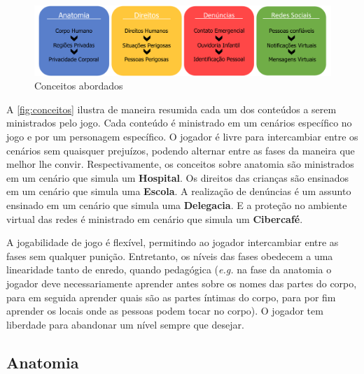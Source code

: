 \begin{figure}[hbt!]
  \caption{\label{fig:conceitos}Conceitos abordados}\vspace{-0.3cm}
  \begin{center}
    \includegraphics[width=\linewidth]{./Visuais/EsquemaFases2.pdf}
    \end{center}\vspace{-0.3cm}
\end{figure}

\vspace{-0.4cm}

A \autoref{fig:conceitos} ilustra de maneira resumida cada um dos conteúdos a serem ministrados pelo jogo. Cada conteúdo é ministrado em um cenários específico no jogo e por um personagem específico. O jogador é livre para intercambiar entre os cenários sem quaisquer prejuízos, podendo alternar entre as fases da maneira que melhor lhe convir. Respectivamente, os conceitos sobre anatomia são ministrados em um cenário que simula um \textbf{Hospital}. Os direitos das crianças são ensinados em um cenário que simula uma \textbf{Escola}. A realização de denúncias é um assunto ensinado em um cenário que simula uma \textbf{Delegacia}. E a proteção no ambiente virtual das redes é ministrado em cenário que simula um \textbf{Cibercafé}.

A jogabilidade de jogo é flexível, permitindo ao jogador intercambiar entre as fases sem qualquer punição. Entretanto, os níveis das fases obedecem a uma linearidade tanto de enredo, quando pedagógica (\textit{e.g.} na fase da anatomia o jogador deve necessariamente aprender antes sobre os nomes das partes do corpo, para em seguida aprender quais são as partes íntimas do corpo, para por fim aprender os locais onde as pessoas podem tocar no corpo). O jogador tem liberdade para abandonar um nível sempre que desejar. %


\subsection{Anatomia}\label{subsec:1}

